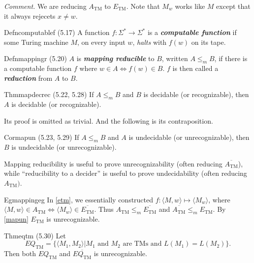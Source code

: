 \textit{Comment.} We are reducing $A_{\mathrm{TM}}$ to $E_{\mathrm{TM}}$. Note that $M_w$ works like $M$ except that it always rejecets $x\neq w$.

\begin{reference}{Defn}{computablef}
  (5.17) A function $f:\Sigma^*\to \Sigma^*$ is a \textbf{\textit{computable function}} if some Turing machine $M$, on every input $w$, \textit{halts} with $f(w)$ on its tape.
\end{reference}

\begin{reference}{Defn}{mappingr}
  (5.20) $A$ is \textbf{\textit{mapping reducible}} to $B$, written $A\leq_m B$, if there is a computable function $f$ where $w\in A \Leftrightarrow f(w)\in B$. $f$ is then called a \textbf{\textit{reduction}} from $A$ to $B$.
\end{reference}

\begin{reference}{Thm}{mapdecrec}
  (5.22, 5.28) If $A\leq_m B$ and $B$ is decidable (or recognizable), then $A$ is decidable (or recognizable).
\end{reference}

Its proof is omitted as trivial. And the following is its contraposition.

\begin{reference}{Cor}{mapun}
  (5.23, 5.29) If $A\leq_m B$ and $A$ is undecidable (or unrecognizable), then $B$ is undecidable (or unrecognizable).
\end{reference}

Mapping reducibility is useful to prove unrecognizability (often reducing $\overline{A_{\mathrm{TM}}}$), while ``reducibility to a decider'' is useful to prove undecidability (often reducing $A_{\mathrm{TM}})$.

\begin{reference}{Eg}{mappingeg}
  In \ref{etm}, we essentially constructed $f:\langle M,w\rangle\mapsto\langle M_w\rangle$, where $\langle M,w\rangle\in A_{\mathrm{TM}}\Leftrightarrow\langle M_w\rangle\in \overline{E_{\mathrm{TM}}}$. Thus $A_{\mathrm{TM}}\leq_m \overline{E_{\mathrm{TM}}}$ and $\overline{A_{\mathrm{TM}}}\leq_m E_{\mathrm{TM}}$. By \ref{mapun} $E_{\mathrm{TM}}$ is unrecognizable.
\end{reference}

\begin{reference}{Thm}{eqtm}
  (5.30) Let
  \[
    EQ_{\mathrm{TM}}=\{\langle M_1,M_2\rangle|M_1\text{ and }M_2\text{ are TMs and }L(M_1)=L(M_2)\}.
  \]
  Then both $EQ_{\mathrm{TM}}$ and $\overline{EQ_{\mathrm{TM}}}$ is unrecognizable.
\end{reference}

